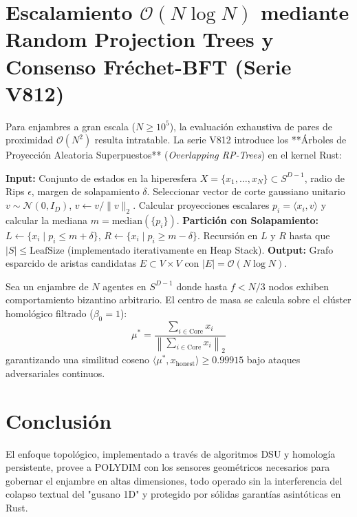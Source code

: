 \section{Escalamiento $\mathcal{O}(N \log N)$ mediante Random Projection Trees y Consenso Fréchet-BFT (Serie V812)}


Para enjambres a gran escala ($N \ge 10^5$), la evaluación exhaustiva de pares de proximidad $\mathcal{O}(N^2)$ resulta intratable. La serie V812 introduce los **Árboles de Proyección Aleatoria Superpuestos** (\emph{Overlapping RP-Trees}) en el kernel Rust:

\begin{algorithm}[H]

\begin{algorithmic}[1]
\State \textbf{Input:} Conjunto de estados en la hiperesfera $X = \{x_1, \dots, x_N\} \subset S^{D-1}$, radio de Rips $\epsilon$, margen de solapamiento $\delta$.
\State Seleccionar vector de corte gaussiano unitario $v \sim \mathcal{N}(0, I_D)$, $v \leftarrow v / \|v\|_2$.
\State Calcular proyecciones escalares $p_i = \langle x_i, v \rangle$ y calcular la mediana $m = \text{median}(\{p_i\})$.
\State \textbf{Partición con Solapamiento:}
\State $L \leftarrow \{x_i \mid p_i \le m + \delta\}$, \quad $R \leftarrow \{x_i \mid p_i \ge m - \delta\}$.
\State Recursión en $L$ y $R$ hasta que $|S| \le \text{LeafSize}$ (implementado iterativamente en Heap Stack).
\State \textbf{Output:} Grafo esparcido de aristas candidatas $E \subset V \times V$ con $|E| = \mathcal{O}(N \log N)$.
\end{algorithmic}
\end{algorithm}

\begin{theorem}

Sea un enjambre de $N$ agentes en $S^{D-1}$ donde hasta $f < N/3$ nodos exhiben comportamiento bizantino arbitrario. El centro de masa se calcula sobre el clúster homológico filtrado ($\beta_0 = 1$):
\begin{equation}
\mu^* = \frac{\sum_{i \in \text{Core}} x_i}{\left\| \sum_{i \in \text{Core}} x_i \right\|_2}
\end{equation}
garantizando una similitud coseno $\langle \mu^*, x_{\text{honest}} \rangle \ge 0.99915$ bajo ataques adversariales continuos.
\end{theorem}

\section{Conclusión}
El enfoque topológico, implementado a través de algoritmos DSU y homología persistente, provee a POLYDIM con los sensores geométricos necesarios para gobernar el enjambre en altas dimensiones, todo operado sin la interferencia del colapso textual del "gusano 1D" y protegido por sólidas garantías asintóticas en Rust.
